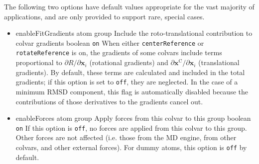 The following two options have default values appropriate for the vast majority of applications, and are only provided to support rare, special cases.
\begin{itemize}

\item %
  \keydef
    {enableFitGradients}{%
    atom group}{%
    Include the roto-translational contribution to colvar gradients}{%
    boolean}{%
    \texttt{on}}{%
    When either \texttt{centerReference} or \texttt{rotateReference} is on,
    the gradients of some colvars include terms proportional to
    $\partial{}R/\partial\mathbf{x}_{i}$ (rotational gradients) and
    $\partial\mathbf{x}^{\mathrm{C}}/\partial\mathbf{x}_{i}$ (translational gradients).
    By default, these terms are calculated and included in the total gradients;
    if this option is set to \texttt{off}, they are neglected.
    In the case of a minimum RMSD component, this flag is automatically disabled
    because the contributions of those derivatives to the gradients cancel out.
}

\item %
  \keydef
    {enableForces}{%
    atom group}{%
    Apply forces from this colvar to this group}{%
    boolean}{%
    \texttt{on}}{%
    If this option is \texttt{off}, no forces are applied from this
    colvar to this group. Other forces are not affected (i.e. those
    from the MD engine, from other colvars, and other external forces).
    For dummy atoms, this option is \texttt{off} by default.
 }

\end{itemize}


\label{sec:colvar_atom_groups_wrapping}

